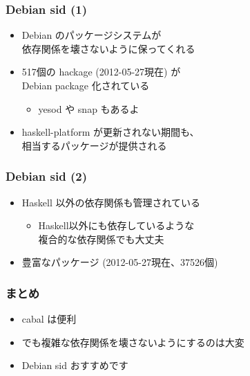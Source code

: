\documentclass[cjk,dvipdfm,14pt]{beamer}
\begin{document}
\begin{frame}
\frametitle{Debian sid (1)}

\begin{itemize}
\item Debian のパッケージシステムが\\依存関係を壊さないように保ってくれる
\item 517個の hackage (2012-05-27現在) が\\ Debian package 化されている
  \begin{itemize}
  \item yesod や snap もあるよ
  \end{itemize}
\item haskell-platform が更新されない期間も、\\相当するパッケージが提供される
\end{itemize}

\end{frame}

\begin{frame}
\frametitle{Debian sid (2)}

\begin{itemize}
\item Haskell 以外の依存関係も管理されている
  \begin{itemize}
  \item Haskell以外にも依存しているような\\複合的な依存関係でも大丈夫
  \end{itemize}
\item 豊富なパッケージ (2012-05-27現在、37526個)
\end{itemize}

\end{frame}

\begin{frame}
\frametitle{まとめ}

\begin{itemize}
\item cabal は便利
\item でも複雑な依存関係を壊さないようにするのは大変
\item Debian sid おすすめです
\end{itemize}

\end{frame}
\end{document}
